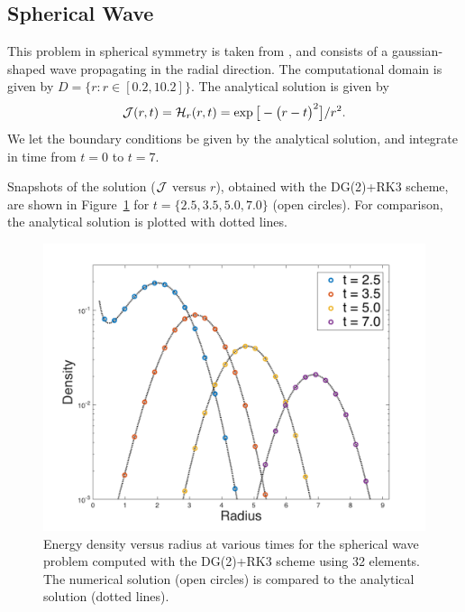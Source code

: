 \documentclass[10pt,preprint]{aastex}
\begin{document}
\subsection{Spherical Wave}

This problem in spherical symmetry is taken from \citet{pons_etal_2000}, and consists of a gaussian-shaped wave propagating in the radial direction.  
The computational domain is given by $D=\{r:r\in[0.2,10.2]\}$.  
The analytical solution is given by
\begin{equation}
  \mathcal{J}(r,t)=\mathcal{H}_{r}(r,t)
  =\exp\big[-\big(r-t\big)^{2}\big]/r^{2}.  
\end{equation}
We let the boundary conditions be given by the analytical solution, and integrate in time from $t=0$ to $t=7$.  

Snapshots of the solution ($\mathcal{J}$ versus $r$), obtained with the DG(2)+RK3 scheme, are shown in Figure~\ref{fig:sphericalWave} for $t=\{2.5,3.5,5.0,7.0\}$ (open circles).  
For comparison, the analytical solution is plotted with dotted lines.  

\begin{figure}
  \begin{center}
    \includegraphics[scale=0.38]{./Figures/GaussianSphericalWave1D}
  \end{center}
  \caption{Energy density versus radius at various times for the spherical wave problem computed with the DG(2)+RK3 scheme using 32 elements.  The numerical solution (open circles) is compared to the analytical solution (dotted lines).  }
  \label{fig:sphericalWave}
\end{figure}
\end{document}
